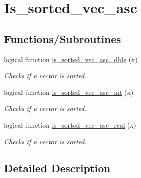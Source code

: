 \hypertarget{group__is__sorted__vec__asc}{\section{Is\-\_\-sorted\-\_\-vec\-\_\-asc}
\label{group__is__sorted__vec__asc}
}
\subsection*{Functions/\-Subroutines}
\begin{DoxyCompactItemize}
\item 
logical function \hyperlink{group__is__sorted__vec__asc_ga4a4ac5dd47b099eed56bbc9c3ded0d70_ga4a4ac5dd47b099eed56bbc9c3ded0d70}{is\-\_\-sorted\-\_\-vec\-\_\-asc\-\_\-dble} (x)
\begin{DoxyCompactList}\small\item\em Checks if a vector is sorted. \end{DoxyCompactList}\item 
logical function \hyperlink{group__is__sorted__vec__asc_ga44ed3679b8cac273a055db8f1c738c8a_ga44ed3679b8cac273a055db8f1c738c8a}{is\-\_\-sorted\-\_\-vec\-\_\-asc\-\_\-int} (x)
\begin{DoxyCompactList}\small\item\em Checks if a vector is sorted. \end{DoxyCompactList}\item 
logical function \hyperlink{group__is__sorted__vec__asc_gab88aff17adaada400a6daa8cc5608a26_gab88aff17adaada400a6daa8cc5608a26}{is\-\_\-sorted\-\_\-vec\-\_\-asc\-\_\-real} (x)
\begin{DoxyCompactList}\small\item\em Checks if a vector is sorted. \end{DoxyCompactList}\end{DoxyCompactItemize}


\subsection{Detailed Description}


